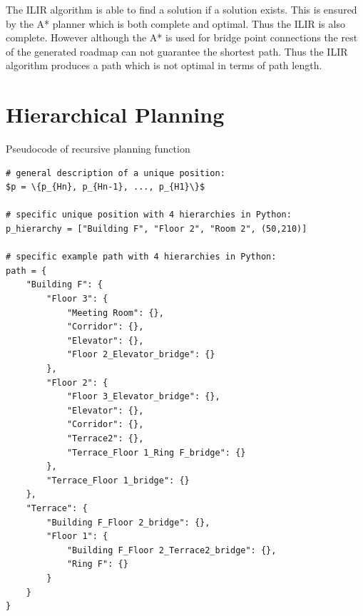 The ILIR algorithm is able to find a solution if a solution exists. This is ensured by the A* planner which is both complete and optimal. Thus the ILIR is also complete. However although the A* is used for bridge point connections the rest of the generated roadmap can not guarantee the shortest path. Thus the ILIR algorithm produces a path which is not optimal in terms of path length.


\section{Hierarchical Planning}
\label{sec:impl_hierarchical_planning}


Pseudocode of recursive planning function


\begin{lstlisting}[float=h]
# general description of a unique position:
$p = \{p_{Hn}, p_{Hn-1}, ..., p_{H1}\}$

# specific unique position with 4 hierarchies in Python:
p_hierarchy = ["Building F", "Floor 2", "Room 2", (50,210)]

# specific example path with 4 hierarchies in Python:
path = {
    "Building F": {
        "Floor 3": {
            "Meeting Room": {},
            "Corridor": {},
            "Elevator": {},
            "Floor 2_Elevator_bridge": {}
        },
        "Floor 2": {
            "Floor 3_Elevator_bridge": {},
            "Elevator": {},
            "Corridor": {},
            "Terrace2": {},
            "Terrace_Floor 1_Ring F_bridge": {}
        },
        "Terrace_Floor 1_bridge": {}
    },
    "Terrace": {
        "Building F_Floor 2_bridge": {},
        "Floor 1": {
            "Building F_Floor 2_Terrace2_bridge": {},
            "Ring F": {}
        }
    }
}
\end{lstlisting}

